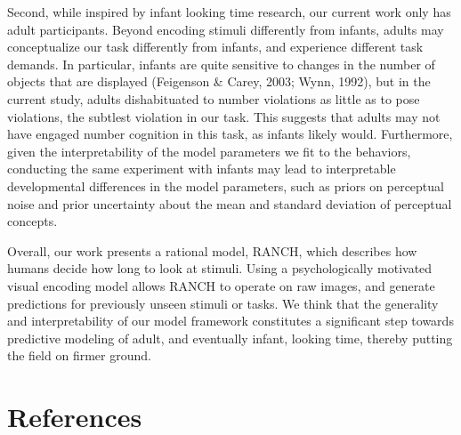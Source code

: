 \documentclass[10pt, letterpaper]{article}
\begin{document}
Second, while inspired by infant looking time research, our current work
only has adult participants. Beyond encoding stimuli differently from
infants, adults may conceptualize our task differently from infants, and
experience different task demands. In particular, infants are quite
sensitive to changes in the number of objects that are displayed
(Feigenson \& Carey, 2003; Wynn, 1992), but in the current study, adults
dishabituated to number violations as little as to pose violations, the
subtlest violation in our task. This suggests that adults may not have
engaged number cognition in this task, as infants likely would.
Furthermore, given the interpretability of the model parameters we fit
to the behaviors, conducting the same experiment with infants may lead
to interpretable developmental differences in the model parameters, such
as priors on perceptual noise and prior uncertainty about the mean and
standard deviation of perceptual concepts.

Overall, our work presents a rational model, RANCH, which describes how
humans decide how long to look at stimuli. Using a psychologically
motivated visual encoding model allows RANCH to operate on raw images,
and generate predictions for previously unseen stimuli or tasks. We
think that the generality and interpretability of our model framework
constitutes a significant step towards predictive modeling of adult, and
eventually infant, looking time, thereby putting the field on firmer
ground.

\hypertarget{references}{%
\section{References}\label{references}}

\setlength{\parindent}{-0.1in} 
\setlength{\leftskip}{0.125in}

\noindent
\end{document}
